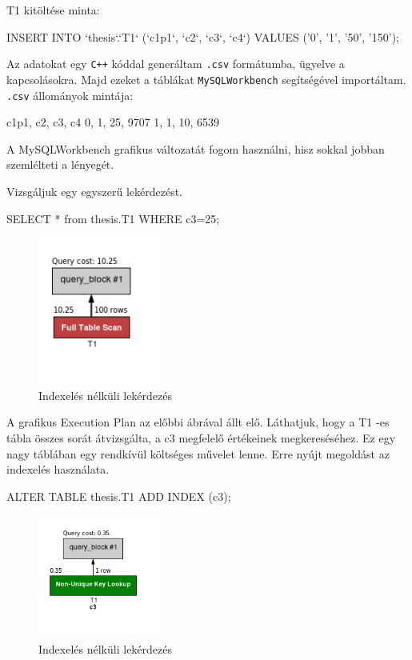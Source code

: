 
T1 kitöltése minta:
\begin{python}
INSERT INTO `thesis`.`T1` (`c1p1`, `c2`, `c3`, `c4`)
VALUES ('0', '1', '50', '150');
\end{python}


Az adatokat egy \texttt{C++} kóddal generáltam \texttt{.csv} formátumba, ügyelve a kapcsolásokra. Majd ezeket a táblákat \texttt{MySQLWorkbench} segítségével importáltam. \texttt{.csv} állományok mintája:
\begin{python}
c1p1, c2, c3, c4
0, 1, 25, 9707
1, 1, 10, 6539
\end{python}


A MySQLWorkbench grafikus változatát fogom használni, hisz sokkal jobban szemlélteti a lényegét.

Vizsgáljuk egy egyszerű lekérdezést.
\begin{python}
SELECT * from thesis.T1 WHERE c3=25; 
\end{python}
\begin{figure}[h!]
\centering
\includegraphics[width=4cm]{images/1-1.png}
\caption{Indexelés nélküli lekérdezés}
\label{fig:schema}
\end{figure}

A grafikus Execution Plan az előbbi ábrával állt elő. Láthatjuk, hogy a T1 -es tábla összes sorát átvizsgálta, a c3 megfelelő értékeinek megkereséséhez. Ez egy nagy táblában egy rendkívül költséges művelet lenne. 
Erre nyújt megoldást az indexelés használata.
\begin{python} 
ALTER TABLE  thesis.T1  ADD INDEX (c3);
\end{python}

\begin{figure}[h!]
\centering
\includegraphics[width=4cm]{images/1-2.png}
\caption{Indexelés nélküli lekérdezés}
\label{fig:schema}
\end{figure}

